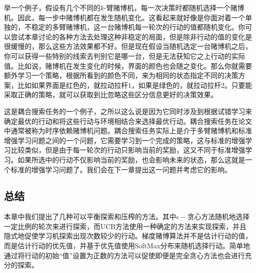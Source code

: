 \documentclass{ctexart}
\begin{document}
            举一个例子，假设有几个不同的$k$-臂赌博机，每一次决策时都随机选择一个赌博机。因此，每一步中赌博机都在发生随机变化。这看起来就好像是你面对着一个单独的，不稳定的多臂赌博机，这一台赌博机每一轮次的行动的值都随机变化。你可以尝试本章讨论的各种方法去处理这种非稳定的局面，但是除非行动的值的变化是很缓慢的，那么这些方法效果都不好。但是现在假设当随机选定一台赌博机之后，你可以获得一些特别的线索去判别它是哪一台，但是无法获知它之上行动的实际值。比如说，赌博机在发生变化的时候，界面的颜色也会随之变化。那么你就需要额外学习一个策略，根据所看到的颜色不同，来为相同的状态指定不同的决策方案，比如如果界面是红色的，就拉动拉杆1，如果是绿色的，就拉动拉杆2。只要能采取正确的策略，就可以获取到比忽略这些区分信息更好的决策效果。

            这是耦合搜索任务的一个例子，之所以这么说是因为它同时涉及到根据试错学习来确定最优的行动和将这些行动与环境相结合来选择最优行动。耦合搜索任务在论文中通常被称为时序依赖赌博机问题。耦合搜索任务实际上是介于多臂赌博机和标准增强学习问题之间的一个问题，它需要学习到一个完成的策略，这与标准的增强学习比较类似，但是由于每一轮次的行动只影响当前的奖励，这又不同于标准增强学习。如果所选中的行动不仅影响当前的奖励，也会影响未来的状态，那么这就是一个标准的增强学习问题了。我们会在下一章提出这一问题并考虑它的影响。

        \subsection{总结}
            本章中我们提出了几种可以平衡探索和压榨的方法。其中$\epsilon-$贪心方法随机地选择一定比例的轮次来进行探索，而UCB方法使用一种确定的方法来实现探索，并且隐式地促使学习机探索出现次数较少的行动。梯度赌博算法并不是估计行动的值，而是估计行动的优先值，并基于优先值使用SoftMax分布来随机选择行动。简单地通过将行动的初始“值”设置为正数的方法可以促使即便是完全贪心方法也会进行充分的探索。
\end{document}
